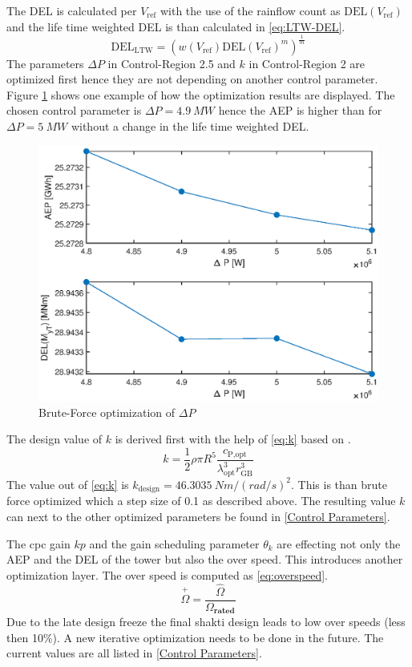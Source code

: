 The \gls{DEL} is calculated per $V_{\text{ref}}$ with the use of the rainflow count as $\text{DEL}(V_{\text{ref}})$ and the life time weighted \gls{DEL} is than calculated in \ref{eq:LTW-DEL}.
\begin{equation}
	\text{DEL}_{\text{LTW}} = \left(w(V_{\text{ref}})\text{DEL}(V_{\text{ref}})^m\right)^{\frac{1}{m}} 
	\label{eq:LTW-DEL}
\end{equation}
The parameters $\Delta P$ in Control-Region 2.5 and  $k$ in Control-Region 2 are optimized first hence they are not depending on another control parameter. Figure \ref{fig:DeltaP} shows one example of how the optimization results are displayed. The chosen control parameter is $\Delta P = \SI{4.9}{MW}$ hence the \gls{AEP} is higher than for $\Delta P = \SI{5}{MW}$ without a change in the life time weighted \gls{DEL}.
\begin{figure}[h]
	\centering	
	\includegraphics[width=12cm]{Figures/DeltaPopt.eps}
	\caption{Brute-Force optimization of $\Delta P$}
	\label{fig:DeltaP}
\end{figure}

The design value of $k$ is derived first with the help of \ref{eq:k} based on \cite{SchlipfLecture}.
\begin{equation}
	k = \frac{1}{2}\rho\pi R^5 \frac{c_{\text{P,opt}}}{\lambda_{\text{opt}}^3 r_{\text{GB}}^3}
	\label{eq:k}
\end{equation}
The value out of \ref{eq:k} is $k_{\text{design}} = \SI{46.3035}{Nm/(rad/s)^2}$. This is than brute force optimized which a step size of 0.1 as described above.
The resulting value $k$ can next to the other optimized parameters be found in \ref{Control Parameters}. 

The \gls{cpc} gain $kp$ and the gain scheduling parameter $\theta_k$ are effecting not only the \gls{AEP} and the \gls{DEL} of the tower but also the over speed. This introduces another optimization layer. The over speed is computed as \ref{eq:overspeed}. 
\begin{equation}
	\overset{+}{\Omega} = \frac{\hat{\Omega}}{\Omega_{\textbf{rated}}}
	\label{eq:overspeed}
\end{equation}  
Due to the late design freeze the final \gls{shakti} design leads to low over speeds (less then 10\%). 
A new iterative optimization needs to be done in the future.
The current values are all listed in \ref{Control Parameters}.